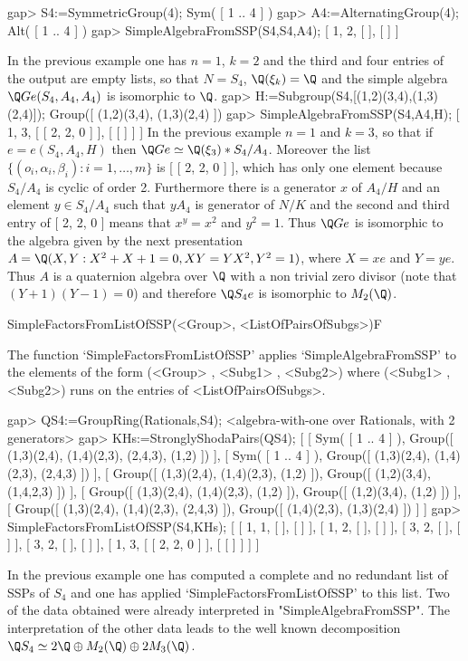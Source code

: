 \beginexample
    gap> S4:=SymmetricGroup(4);
    Sym( [ 1 .. 4 ] )
    gap> A4:=AlternatingGroup(4);
    Alt( [ 1 .. 4 ] )
    gap> SimpleAlgebraFromSSP(S4,S4,A4);
    [ 1, 2, [  ], [  ] ]
\endexample

In the previous example one has $n=1$, $k=2$ and the third and four 
entries of the output are empty lists, so that $N=S_4$, $\Q(\xi_k)=\Q$ and 
the simple algebra $\Q Ge(S_4,A_4,A_4)$ is isomorphic to $\Q$. 
\beginexample
    gap> H:=Subgroup(S4,[(1,2)(3,4),(1,3)(2,4)]);
    Group([ (1,2)(3,4), (1,3)(2,4) ])
    gap> SimpleAlgebraFromSSP(S4,A4,H);
    [ 1, 3, [ [ 2, 2, 0 ] ], [ [  ] ] ]
\endexample
In the previous example $n=1$ and $k=3$, so that if $e=e(S_4,A_4,H)$ then 
$\Q Ge\simeq \Q(\xi_3)*S_4/A_4$. 
Moreover the list $\{(o_i,\alpha_i,\beta_i):i=1,\ldots,m\}$ is [ [ 2, 2, 0 ] ], 
which has only one element because $S_4/A_4$ is cyclic of order 2. Furthermore there 
is a generator $x$ of $A_4/H$ and an element $y\in S_4/A_4$ such that $yA_4$ is generator of 
$N/K$ and the second and third entry of [ 2, 2, 0 ] means that $x^y= x^2$ and 
$y^2=1$. Thus $\Q Ge$ is isomorphic to the algebra given by the next 
presentation $A=\Q(X,Y: X^2+X+1=0,XY=YX^2,Y^2=1)$, where $X=xe$ and $Y=ye$. Thus 
$A$ is a quaternion algebra over $\Q$ with a non trivial zero divisor (note that 
$(Y+1)(Y-1)=0$) and therefore $\Q S_4 e$ is isomorphic to $M_2(\Q)$. 

\>SimpleFactorsFromListOfSSP(<Group>, <ListOfPairsOfSubgs>)F

The function `SimpleFactorsFromListOfSSP' applies `SimpleAlgebraFromSSP' to the elements of 
the form (<Group> , <Subg1> , <Subg2>) where (<Subg1> , <Subg2>) runs on the entries of 
<ListOfPairsOfSubgs>.


\beginexample
    gap> QS4:=GroupRing(Rationals,S4);
    <algebra-with-one over Rationals, with 2 generators>
    gap> KHs:=StronglyShodaPairs(QS4);
    [ [ Sym( [ 1 .. 4 ] ), Group([ (1,3)(2,4), (1,4)(2,3), (2,4,3), (1,2) ]) ],
    [ Sym( [ 1 .. 4 ] ), Group([ (1,3)(2,4), (1,4)(2,3), (2,4,3) ]) ],
    [ Group([ (1,3)(2,4), (1,4)(2,3), (1,2) ]),
        Group([ (1,2)(3,4), (1,4,2,3) ]) ],
    [ Group([ (1,3)(2,4), (1,4)(2,3), (1,2) ]), Group([ (1,2)(3,4), (1,2) ]) ],
    [ Group([ (1,3)(2,4), (1,4)(2,3), (2,4,3) ]),
        Group([ (1,4)(2,3), (1,3)(2,4) ]) ] ]
    gap> SimpleFactorsFromListOfSSP(S4,KHs);
    [ [ 1, 1, [  ], [  ] ], [ 1, 2, [  ], [  ] ], [ 3, 2, [  ], [  ] ],
    [ 3, 2, [  ], [  ] ], [ 1, 3, [ [ 2, 2, 0 ] ], [ [  ] ] ] ]
\endexample

In the previous example one has computed a complete and no redundant list of SSPs of $S_4$ and 
one has applied `SimpleFactorsFromListOfSSP' to this list. Two of the data obtained were 
already interpreted in "SimpleAlgebraFromSSP". The interpretation of the other data leads to 
the well known decomposition $\Q S_4 \simeq 2\Q \oplus M_2(\Q) \oplus 2 M_3(\Q)$. 

